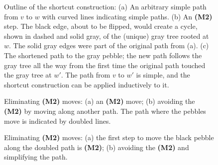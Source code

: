 \documentclass[Svgc,nospthms]{Svgc}
\begin{document}
	\begin{figure}[htbp]
	\centering
	\hspace{.3in}
	\hspace{.3in}
	
	\caption{Outline of the shortcut construction: (a) An arbitrary simple path from $v$ to $w$ with
	curved lines indicating simple paths.
	(b) An {\bf (M2)} step. The black edge, about to be flipped, would create a cycle, 
	shown in dashed and solid gray, of the (unique) gray tree rooted at $w$.  The solid gray edges were part of the original path from (a).
	(c) The shortened path
	to the gray pebble; the new path follows the gray tree all the way from the first time the original
	path touched the gray tree at $w'$.  The path from $v$ to $w'$ is simple, and the shortcut construction
	can be applied inductively to it.}
	\label{fig.m2-meta-picture}
	\end{figure}
	
	\begin{figure}[htbp]
	\centering
	
	\caption{Eliminating {\bf (M2)} moves: (a) an {\bf (M2)} move; (b) avoiding the 
	{\bf (M2)} by moving along another path.  The path where the pebbles move is indicated
	by doubled lines.}
	\label{fig.m2-move-eliminate}
	\end{figure}
	
	\begin{figure}[htbp]
	\centering
	
	\caption{Eliminating {\bf (M2)} moves: (a) the first step to move the black pebble along the 
	doubled path is {\bf (M2)}; (b) avoiding the 
	{\bf (M2)} and simplifying the path.}
	\label{fig.m2-move-eliminate-2}
	\end{figure}
	
\end{document}
